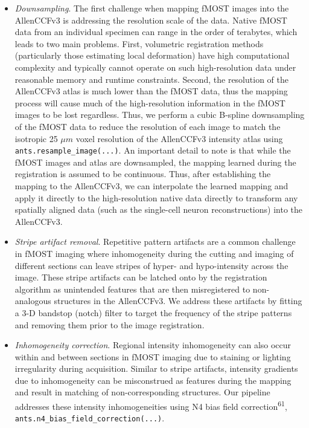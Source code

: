 \documentclass[
  12pt,
]{article}
\begin{document}
\begin{itemize}
\item
  \emph{Downsampling}. The first challenge when mapping fMOST images
  into the AllenCCFv3 is addressing the resolution scale of the data.
  Native fMOST data from an individual specimen can range in the order
  of terabytes, which leads to two main problems. First, volumetric
  registration methods (particularly those estimating local deformation)
  have high computational complexity and typically cannot operate on
  such high-resolution data under reasonable memory and runtime
  constraints. Second, the resolution of the AllenCCFv3 atlas is much
  lower than the fMOST data, thus the mapping process will cause much of
  the high-resolution information in the fMOST images to be lost
  regardless. Thus, we perform a cubic B-spline downsampling of the
  fMOST data to reduce the resolution of each image to match the
  isotropic 25 \(\mu m\) voxel resolution of the AllenCCFv3 intensity
  atlas using \texttt{ants.resample\_image(...)}. An important detail to
  note is that while the fMOST images and atlas are downsampled, the
  mapping learned during the registration is assumed to be continuous.
  Thus, after establishing the mapping to the AllenCCFv3, we can
  interpolate the learned mapping and apply it directly to the
  high-resolution native data directly to transform any spatially
  aligned data (such as the single-cell neuron reconstructions) into the
  AllenCCFv3.
\item
  \emph{Stripe artifact removal}. Repetitive pattern artifacts are a
  common challenge in fMOST imaging where inhomogeneity during the
  cutting and imaging of different sections can leave stripes of hyper-
  and hypo-intensity across the image. These stripe artifacts can be
  latched onto by the registration algorithm as unintended features that
  are then misregistered to non-analogous structures in the AllenCCFv3.
  We address these artifacts by fitting a 3-D bandstop (notch) filter to
  target the frequency of the stripe patterns and removing them prior to
  the image registration.
\item
  \emph{Inhomogeneity correction}. Regional intensity inhomogeneity can
  also occur within and between sections in fMOST imaging due to
  staining or lighting irregularity during acquisition. Similar to
  stripe artifacts, intensity gradients due to inhomogeneity can be
  misconstrued as features during the mapping and result in matching of
  non-corresponding structures. Our pipeline addresses these intensity
  inhomogeneities using N4 bias field correction\textsuperscript{61},
  \texttt{ants.n4\_bias\_field\_correction(...)}.
\end{itemize}
\end{document}
